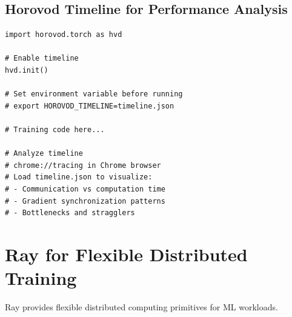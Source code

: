\subsection{Horovod Timeline for Performance Analysis}

\begin{lstlisting}[style=python, caption=Horovod performance profiling]
import horovod.torch as hvd

# Enable timeline
hvd.init()

# Set environment variable before running
# export HOROVOD_TIMELINE=timeline.json

# Training code here...

# Analyze timeline
# chrome://tracing in Chrome browser
# Load timeline.json to visualize:
# - Communication vs computation time
# - Gradient synchronization patterns
# - Bottlenecks and stragglers
\end{lstlisting}

\section{Ray for Flexible Distributed Training}

Ray provides flexible distributed computing primitives for ML workloads.

